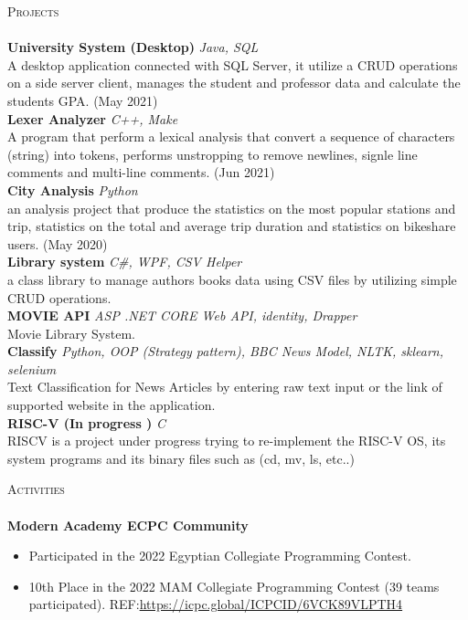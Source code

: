 \documentclass[a4paper]{article}
\newcommand{\lineunder} {
    \vspace*{-8pt} \\
    \hspace*{-18pt} \hrulefill \\
}
\newcommand{\header} [1] {
    {\hspace*{-18pt}\vspace*{6pt} \textsc{#1}}
    \vspace*{-6pt} \lineunder
}
\begin{document}
\header{Projects}
{\textbf{University System (Desktop)}} {\sl Java, SQL} \\
A desktop application connected with SQL Server, it utilize a CRUD operations on a side server client, manages the student and professor data and calculate the student\textquotesingle{}s GPA. (May 2021)\\
\vspace*{2mm}
{\textbf{Lexer Analyzer}} {\sl C++, Make} \\
A program that perform a lexical analysis that convert a sequence of characters (string) into tokens, performs unstropping to remove newlines, signle line comments and multi-line comments. (Jun 2021)\\
\vspace*{2mm}
{\textbf{City Analysis}} {\sl Python} \\
an analysis project that produce the statistics on the most popular stations and trip, statistics on the total and average trip duration and statistics on bikeshare users. (May 2020)\\
\vspace*{2mm}
{\textbf{Library system}} {\sl C\#, WPF, CSV Helper} \\
a class library to manage author\textquotesingle{}s books data using CSV files by utilizing simple CRUD operations.\\
\vspace*{2mm}
{\textbf{MOVIE API}} {\sl ASP .NET CORE Web API, identity, Drapper} \\
Movie Library System.
\\
\vspace*{2mm}
{\textbf{Classify}} {\sl Python, OOP (Strategy pattern), BBC News Model, NLTK, sklearn, selenium} \\
Text Classification for News Articles by entering raw text input or the link of supported website in the application.
\\
\vspace*{2mm}
{\textbf{RISC-V (In progress )}} {\sl C} \\
RISCV is a project under progress trying to re-implement the RISC-V OS, its system programs and its binary files such as (cd, mv, ls, etc..)\\
\vspace*{2mm}
\header{Activities}
\textbf{Modern Academy ECPC Community}\\
\begin{itemize} \itemsep 1pt
	\item Participated in the 2022  Egyptian Collegiate Programming Contest.
	\item 10th Place in the 2022 MAM Collegiate Programming Contest (39 teams participated). REF:\url{https://icpc.global/ICPCID/6VCK89VLPTH4}
\end{itemize}
\end{document}
